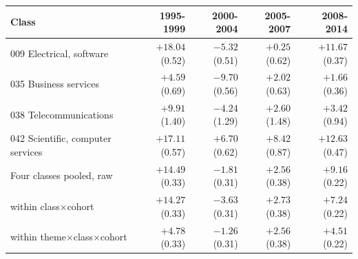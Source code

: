 \begin{tabular}{lrrrr}
\toprule
Class & 1995-1999 & 2000-2004 & 2005-2007 & 2008-2014 \\
\midrule
009 Electrical, software & $+18.04$ (0.52) & $-5.32$ (0.51) & $+0.25$ (0.62) & $+11.67$ (0.37) \\
035 Business services & $+4.59$ (0.69) & $-9.70$ (0.56) & $+2.02$ (0.63) & $+1.66$ (0.36) \\
038 Telecommunications & $+9.91$ (1.40) & $-4.24$ (1.29) & $+2.60$ (1.48) & $+3.42$ (0.94) \\
042 Scientific, computer services & $+17.11$ (0.57) & $+6.70$ (0.62) & $+8.42$ (0.87) & $+12.63$ (0.47) \\
\midrule
Four classes pooled, raw & $+14.49$ (0.33) & $-1.81$ (0.31) & $+2.56$ (0.38) & $+9.16$ (0.22) \\
\quad within class$\times$cohort & $+14.27$ (0.33) & $-3.63$ (0.31) & $+2.73$ (0.38) & $+7.24$ (0.22) \\
\quad within theme$\times$class$\times$cohort & $+4.78$ (0.33) & $-1.26$ (0.31) & $+2.56$ (0.38) & $+4.51$ (0.22) \\
\bottomrule
\end{tabular}

